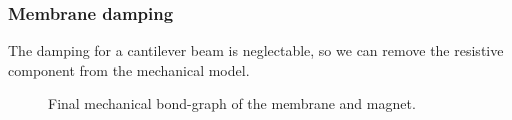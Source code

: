 \subsubsection{Membrane damping}
The damping for a cantilever beam is neglectable, so we can remove the resistive component from the mechanical model.
\begin{figure}
    \centering
    \resizebox{.9\linewidth}{!}{
            
    }
    \caption{Final mechanical bond-graph of the membrane and magnet.}
    \label{fig:Membrane_bond graph_without_damping}
\end{figure}

